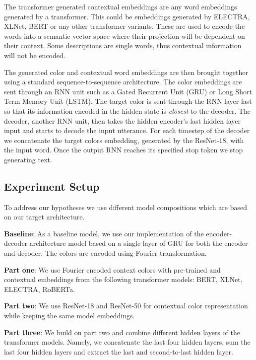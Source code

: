 \par
The transformer generated contextual embeddings are any word embeddings generated by a transformer. This could be embeddings generated by ELECTRA, XLNet, BERT or any other transformer variants. These are used to encode the words into a semantic vector space where their projection will be dependent on their context. Some descriptions are single words, thus contextual information will not be encoded.

\par
The generated color and contextual word embeddings are then brought together using a standard sequence-to-sequence architecture. The color embeddings are sent through an RNN unit such as a Gated Recurrent Unit (GRU) or Long Short Term Memory Unit (LSTM). The target color is sent through the RNN layer last so that its information encoded in the hidden state is \emph{closest} to the decoder. The decoder, another RNN unit, then takes the hidden encoder's last hidden layer input and starts to decode the input utterance. For each timestep of the decoder we concatenate the target colors embedding, generated by the ResNet-18, with the input word. Once the output RNN reaches its specified stop token we stop generating text.

\subsection{Experiment Setup}
To address our hypotheses we use different model compositions which are based on our target architecture.

\textbf{Baseline}:
As a baseline model, we use our implementation of the encoder-decoder architecture model based on a single layer of GRU for both the encoder and decoder. The colors are encoded using Fourier transformation.

\textbf{Part one}:
We use Fourier encoded context colors with pre-trained and contextual embeddings from the following transformer models: BERT, XLNet, ELECTRA, RoBERTa.

\textbf{Part two}:
We use ResNet-18 and ResNet-50 for contextual color representation while keeping the same model embeddings.

\textbf{Part three}:
We build on part two and combine different hidden layers of the transformer models. Namely, we concatenate the last four hidden layers, sum the last four hidden layers and extract the last and second-to-last hidden layer.